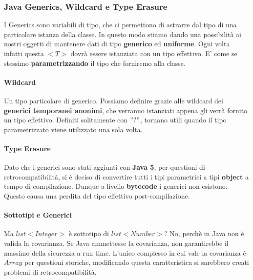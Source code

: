 \documentclass{article}
\begin{document}
\subsubsection{Java Generics, Wildcard e Type Erasure}

I Generics sono variabili di tipo, che ci permettono di astrarre dal tipo di una particolare istanza della classe. In questo modo stiamo dando una possibilità ai nostri oggetti di mantenere dati di tipo \textbf{generico} ed \textbf{uniforme}. Ogni volta infatti questa $<T>$ dovrà essere istanziata con un tipo effettivo. E' come se stessimo \textbf{parametrizzando} il tipo che forniremo alla classe.

\vspace*{15px}

\paragraph{Wildcard} Un tipo particolare di generico. Possiamo definire grazie alle wildcard dei \textbf{generici temporanei anonimi}, che verranno istanziati appena gli verrà fornito un tipo effettivo. Definiti solitamente con $"?"$, tornano utili quando il tipo parametrizzato viene utilizzato una sola volta.

\vspace*{15px}

\paragraph{Type Erasure} Dato che i generici sono stati aggiunti con \textbf{Java 5}, per questioni di retrocompatibilità, si è deciso di convertire tutti i tipi parametrici a tipi \textbf{object} a tempo di compilazione. Dunque a livello \textbf{bytecode} i generici non esistono. Questo causa una perdita del tipo effettivo post-compilazione.

\vspace*{15px}

\paragraph{Sottotipi e Generici} Ma $list<Integer>$ è sottotipo di $list<Number>$?
No, perchè in Java non è valida la covarianza. Se Java ammettesse la covarianza, non garantirebbe il massimo della sicurezza a run time. L'unico complesso in cui vale la covarianza è $Array$ per questioni storiche, modificando questa caratteristica si sarebbero creati problemi di retrocompatibilità.
\end{document}
